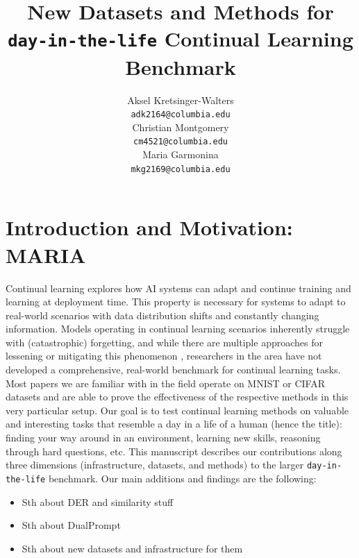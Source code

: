 \documentclass{article}
\title{New Datasets and Methods for \texttt{day-in-the-life} Continual Learning Benchmark}
\begin{document}
\author{%
  Aksel Kretsinger-Walters \\
  \texttt{adk2164@columbia.edu} \\
  \And
  Christian Montgomery \\
  \texttt{cm4521@columbia.edu} \\
  \And
  Maria Garmonina \\
  \texttt{mkg2169@columbia.edu} \\
}

\maketitle

\begin{abstract}

\end{abstract}

\section{Introduction and Motivation: MARIA}
Continual learning explores how AI systems can adapt and continue training and learning at deployment time.
This property is necessary for systems to adapt to real-world scenarios with data distribution shifts and
constantly changing information. Models operating in continual learning scenarios inherently struggle with
(catastrophic) forgetting, and while there are multiple approaches for lessening or mitigating this
phenomenon \cite{cl-overview}, researchers in the area have not developed a comprehensive, real-world
benchmark for continual learning tasks. Most papers we are familiar with in the field operate on MNIST or
CIFAR datasets and are able to prove the effectiveness of the respective methods in this very particular
setup. Our goal is to test continual learning methods on valuable and interesting tasks that resemble a day
in a life of a human (hence the title): finding your way around in an environment, learning new skills,
reasoning through hard questions, etc. This manuscript describes our contributions along three dimensions
(infrastructure, datasets, and methods) to the larger \texttt{day-in-the-life} benchmark. Our main additions
and findings are the following:
\begin{itemize}
		\item Sth about DER and similarity stuff
		\item Sth about DualPrompt
		\item Sth about new datasets and infrastructure for them
\end{itemize}
\end{document}
